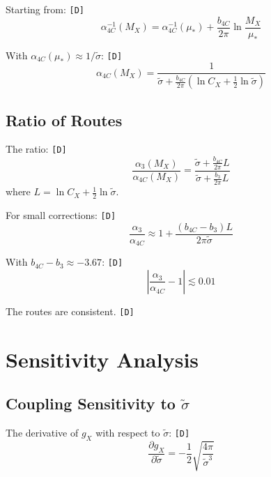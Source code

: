 \documentclass[11pt,a4paper]{article}
\newcommand{\tagD}{\textcolor{green!50!black}{\texttt{[D]}}}
\theoremstyle{definition}
\begin{document}
Starting from: \tagD{}
\begin{equation}
\label{eq:app-t2-d1}
\alpha_{4C}^{-1}(M_X) = \alpha_{4C}^{-1}(\mu_*) + \frac{b_{4C}}{2\pi}\ln\frac{M_X}{\mu_*}
\end{equation}

With $\alpha_{4C}(\mu_*) \approx 1/\tilde{\sigma}$: \tagD{}
\begin{equation}
\label{eq:app-t2-d2}
\alpha_{4C}(M_X) = \frac{1}{\tilde{\sigma} + \frac{b_{4C}}{2\pi}(\ln C_X + \frac{1}{2}\ln\tilde{\sigma})}
\end{equation}

\subsection{Ratio of Routes}
\label{app:ratio}

The ratio: \tagD{}
\begin{equation}
\label{eq:app-ratio-1}
\frac{\alpha_3(M_X)}{\alpha_{4C}(M_X)} = \frac{\tilde{\sigma} + \frac{b_{4C}}{2\pi}L}{\tilde{\sigma} + \frac{b_3}{2\pi}L}
\end{equation}
where $L = \ln C_X + \frac{1}{2}\ln\tilde{\sigma}$.

For small corrections: \tagD{}
\begin{equation}
\label{eq:app-ratio-2}
\frac{\alpha_3}{\alpha_{4C}} \approx 1 + \frac{(b_{4C} - b_3)L}{2\pi\tilde{\sigma}}
\end{equation}

With $b_{4C} - b_3 \approx -3.67$: \tagD{}
\begin{equation}
\label{eq:app-ratio-3}
\left|\frac{\alpha_3}{\alpha_{4C}} - 1\right| \lesssim 0.01
\end{equation}

The routes are consistent. \tagD{}

\section{Sensitivity Analysis}
\label{app:sensitivity}

\subsection{Coupling Sensitivity to $\tilde{\sigma}$}
\label{app:coupling-sensitivity}

The derivative of $g_X$ with respect to $\tilde{\sigma}$: \tagD{}
\begin{equation}
\label{eq:app-sens-1}
\frac{\partial g_X}{\partial \tilde{\sigma}} = -\frac{1}{2} \sqrt{\frac{4\pi}{\tilde{\sigma}^3}}
\end{equation}
\end{document}

